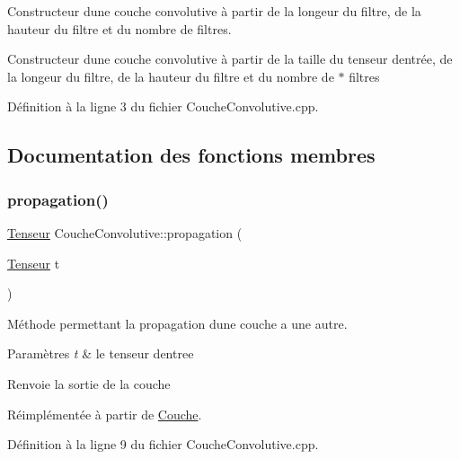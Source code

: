 Constructeur d\textquotesingle{}une couche convolutive à partir de la longeur du filtre, de la hauteur du filtre et du nombre de filtres. 

Constructeur d\textquotesingle{}une couche convolutive à partir de la taille du tenseur d\textquotesingle{}entrée, de la longeur du filtre, de la hauteur du filtre et du nombre de $\ast$ filtres 

Définition à la ligne 3 du fichier Couche\+Convolutive.\+cpp.



\subsection{Documentation des fonctions membres}
\mbox{\label{class_couche_convolutive_ad1a55b3dc9bf52e0725ae2a7b2e92aa1}} 
\subsubsection{\texorpdfstring{propagation()}{propagation()}}
{\footnotesize\ttfamily \hyperlink{class_tenseur}{Tenseur} Couche\+Convolutive\+::propagation (\begin{DoxyParamCaption}\item[{\hyperlink{class_tenseur}{Tenseur}}]{t }\end{DoxyParamCaption})\hspace{0.3cm}{\ttfamily [virtual]}}



Méthode permettant la propagation d\textquotesingle{}une couche a une autre. 


\begin{DoxyParams}{Paramètres}
{\em t} & le tenseur d\textquotesingle{}entree \\
\hline
\end{DoxyParams}
\begin{DoxyReturn}{Renvoie}
la sortie de la couche 
\end{DoxyReturn}


Réimplémentée à partir de \hyperlink{class_couche_a1f0ed59e21020f5d4f37933af4d1b1e5}{Couche}.



Définition à la ligne 9 du fichier Couche\+Convolutive.\+cpp.

\mbox{\label{class_couche_convolutive_a30fd844fc3a96f2e90d1a20251b1bfe3}} 
